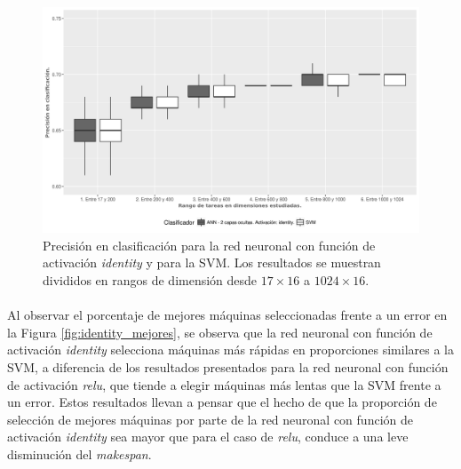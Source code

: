 \begin{figure}[H]
  \centering
  \includegraphics[width=\columnwidth]{imagenes/identity/3_accuracy_ann_2_capas_ocultas_identity.png}
  \caption{Precisión en clasificación para la red neuronal con función de activación \textit{identity} y para la SVM.
Los resultados se muestran divididos en rangos de dimensión desde $ 17 \times 16$ a $ 1024 \times 16$.}
  \label{fig:identity_accuracy}
\end{figure}

\paragraph{}Al observar el porcentaje de mejores máquinas seleccionadas frente a un error en la Figura \ref{fig:identity_mejores}, se observa que la red neuronal con función de activación \textit{identity} selecciona máquinas más rápidas en proporciones similares a la SVM, a diferencia de los resultados presentados para la red neuronal con función de activación \textit{relu}, que tiende a elegir máquinas más lentas que la SVM frente a un error.
Estos resultados llevan a pensar que el hecho de que la proporción de selección de mejores máquinas por parte de la red neuronal con función de activación \textit{identity} sea mayor que para el caso de \textit{relu}, conduce a una leve disminución del \textit{makespan}. 

\newpage %

